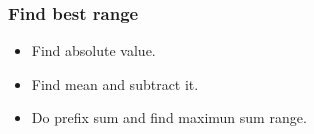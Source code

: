 \begin{frame}
    \frametitle{Find best range}
    \begin{itemize}
		\item Find absolute value. 
		\item Find mean and subtract it.  
		\item Do prefix sum and find maximun sum range.    	  
    \end{itemize}
\end{frame}




